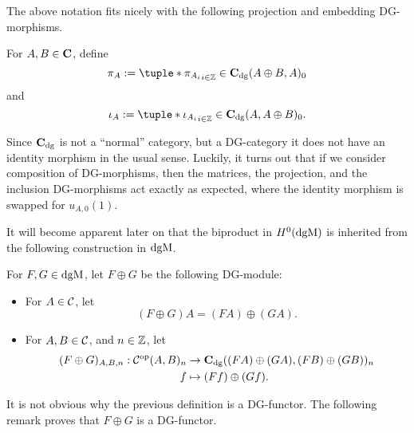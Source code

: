 The above notation fits nicely with the following projection and embedding DG-morphisms.
\begin{definition}
    For \( A, B \in \operatorname{\mathbf{C}} \), define
    \[
        \pi_A := \tuple*{\pi_{A_i}}_{i \in \Zb} \in \C_{\dg}(A \oplus B, A)_0
    \]
    and
    \[
        \iota_A := \tuple*{\iota_{A_i}}_{i \in \Zb} \in \C_{\dg}(A, A \oplus B)_0.
    \]
\end{definition}

Since \( \operatorname{\mathbf{C}}_{\operatorname{dg}} \) is not a ``normal'' category, but a DG-category it does not have an identity morphism in the usual sense. Luckily, it turns out that if we consider composition of DG-morphisms, then the matrices, the projection, and the inclusion DG-morphisms act exactly as expected, where the identity morphism is swapped for \( u_{A, 0}(1) \).

It will become apparent later on that the biproduct in \( H^0(\operatorname{dgM}) \) is inherited from the following construction in \( \operatorname{dgM} \).

\begin{definition}
    \label{def:dgm_biproduct}
    For \( F, G \in \operatorname{dgM} \), let \( F \oplus G \) be the following DG-module:
    \begin{itemize}
        \item {
            For \( A \in {\mathcal{C}} \), let
            \[
                (F \oplus G) A = (F A) \oplus (G A).
            \]
        }
        \item {
            For \( A, B \in {\mathcal{C}} \), and \( n \in {\mathbb{Z}} \), let
            \begin{align*}
                (F \oplus G)_{A, B, n}: {\mathcal{C}}^{\operatorname{op}}(A, B)_n &\to \operatorname{\mathbf{C}}_{\operatorname{dg}}((F A) \oplus (G A), (F B) \oplus (G B))_n \\
                f &\mapsto (F f) \oplus (G f).
            \end{align*}
        }
    \end{itemize}
\end{definition}

It is not obvious why the previous definition is a DG-functor. The following remark proves that \( F \oplus G \) is a DG-functor.

